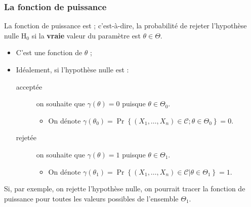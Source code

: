 \documentclass[10pt, french]{article}
\begin{document}
\begin{multicols*}{2}
\subsubsection{La fonction de puissance}
La fonction de puissance est  ; c'est-à-dire, la probabilité de rejeter l'hypothèse nulle $\mathrm{H}_{0}$ si la \textbf{vraie} valeur du paramètre est $\theta \in \Theta$. 
\begin{itemize}
	\item	C'est une fonction de $\theta$ ;
	\item	Idéalement, si l'hypothèse nulle est :
		\begin{description}
		\item[acceptée]	on souhaite que $\gamma(\theta)	=	0$ puisque $\theta \in \Theta_{0}$.
			\begin{itemize}
			\item	On dénote $\gamma(\theta_{0})	=	\Pr\left\{(X_{1}, \dots, X_{n}) \in \mathcal{C} ;  \theta \in \Theta_{0}\right\}	=	0$.
			\end{itemize}
		\item[rejetée]	on souhaite que $\gamma(\theta)	=	1$ puisque $\theta \in \Theta_{1}$.
			\begin{itemize}
			\item	On dénote $\gamma(\theta_{1})	=	\Pr\left\{(X_{1}, \dots, X_{n}) \in \mathcal{C} | \theta \in \Theta_{1}\right\}	=	1$.
			\end{itemize}
		\end{description}
\end{itemize}

Si, par exemple, on rejette l'hypothèse nulle, on pourrait tracer la fonction de puissance pour toutes les valeurs possibles de l'ensemble $\Theta_{1}$.




\columnbreak


\end{multicols*}
\end{document}
